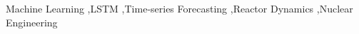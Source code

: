\documentclass[numbers,review,3p,times]{elsarticle}
\begin{document}
\begin{frontmatter}
\begin{keyword}


Machine Learning \sep LSTM \sep Time-series Forecasting \sep Reactor Dynamics \sep Nuclear Engineering
\end{keyword}

\end{frontmatter}



\renewcommand{\hl}[1]{#1}
\renewcommand{\emph}[1]{#1}






% 
% 
% 


\appendix


 

\end{document}
